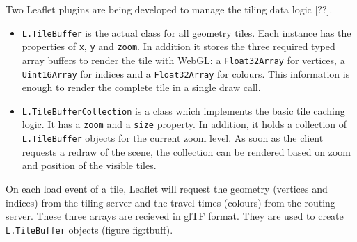       Two Leaflet plugins are being developed to manage the tiling data logic [??].\par
      \begin{itemize}
        \item \texttt{L.TileBuffer} is the actual class for all geometry tiles. Each instance has the properties of \texttt{x}, \texttt{y} and \texttt{zoom}. In addition it stores the three required typed array buffers to render the tile with WebGL: a \texttt{Float32Array} for vertices, a \texttt{Uint16Array} for indices and a \texttt{Float32Array} for colours. This information is enough to render the complete tile in a single draw call.
        \item \texttt{L.TileBufferCollection} is a class which implements the basic tile caching logic. It has a \texttt{zoom} and a \texttt{size} property. In addition, it holds a collection of \texttt{L.Tile\-Buffer} objects for the current zoom level. As soon as the client requests a redraw of the scene, the collection can be rendered based on zoom and position of the visible tiles.
      \end{itemize}
      On each load event of a tile, Leaflet will request the geometry (vertices and indices) from the tiling server and the travel times (colours) from the routing server. These three arrays are recieved in glTF format. They are used to create \texttt{L.TileBuffer} objects (figure {fig:tbuff}).\par


